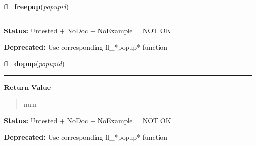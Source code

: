     \label{xformslib:deprecated:fl_freepup}

    \vspace{0.5ex}

\hspace{.8\funcindent}\begin{boxedminipage}{\funcwidth}

    \raggedright \textbf{fl\_freepup}(\textit{popupid})

    \vspace{-1.5ex}

    \rule{\textwidth}{0.5\fboxrule}
\setlength{\parskip}{2ex}
\setlength{\parskip}{1ex}
\textbf{Status:} Untested + NoDoc + NoExample = NOT OK



\textbf{Deprecated:} Use corresponding fl\_*popup* function



    \end{boxedminipage}

    \label{xformslib:deprecated:fl_dopup}

    \vspace{0.5ex}

\hspace{.8\funcindent}\begin{boxedminipage}{\funcwidth}

    \raggedright \textbf{fl\_dopup}(\textit{popupid})

    \vspace{-1.5ex}

    \rule{\textwidth}{0.5\fboxrule}
\setlength{\parskip}{2ex}
\setlength{\parskip}{1ex}
      \textbf{Return Value}
    \vspace{-1ex}

      \begin{quote}
      num

      \end{quote}

\textbf{Status:} Untested + NoDoc + NoExample = NOT OK



\textbf{Deprecated:} Use corresponding fl\_*popup* function



    \end{boxedminipage}

